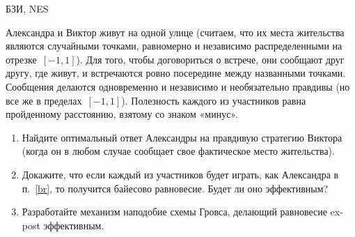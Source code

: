 \begin{problem}
\begin{source}
БЗИ, NES
\end{source}
 Александра и Виктор живут на
одной улице (считаем, что их места жительства являются
случайными точками, равномерно и независимо распределенными
на отрезке~$[-1,1]$). Для того, чтобы договориться о
встрече, они сообщают друг другу, где живут, и встречаются
ровно посередине между названными точками. Сообщения
делаются одновременно и независимо и необязательно правдивы
(но все же в пределах~$[-1,1]$). Полезность каждого из
участников равна пройденному расстоянию, взятому со знаком
«минус».
\begin{enumerate}
 \item\label{br} Найдите оптимальный ответ Александры на правдивую
стратегию Виктора (когда он в любом случае сообщает свое
фактическое место жительства).
 \item Докажите, что если каждый из участников будет играть, как Александра
в п.~\ref{br}, то получится байесово равновесие. Будет ли
оно эффективным?
 \item{\red [T]} Разработайте механизм наподобие схемы Гровса, делающий
равновесие ex-post эффективным.
\end{enumerate}






\begin{sol}

\end{sol}
\end{problem}




